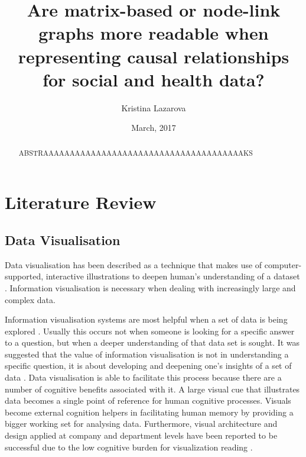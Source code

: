 \documentclass{l4proj}
\begin{document}
\title{Are matrix-based or node-link graphs more readable when representing causal relationships for social and health data?}
\author{Kristina Lazarova}
\date{March, 2017}
\maketitle

\begin{abstract}

ABSTRAAAAAAAAAAAAAAAAAAAAAAAAAAAAAAAAAAAAAAKS
\end{abstract}

\educationalconsent
%
%
\tableofcontents
\chapter{Literature Review}

\section{Data Visualisation}

Data visualisation has been described as a technique that makes use of computer-supported, interactive illustrations to deepen human's understanding of a dataset \cite{card1999readings}. Information visualisation is necessary when dealing with increasingly large and complex data.

Information visualisation systems are most helpful when a set of data is being explored \cite{fekete2008value}. Usually this occurs not when someone is looking for a specific answer to a question, but when a deeper understanding of that data set is sought. It was suggested that the value of information visualisation is not in understanding a specific question, it is about developing and deepening one's insights of a set of data \cite{fekete2008value}. Data visualisation is able to facilitate this process because there are a number of cognitive benefits associated with it. A large visual cue that illustrates data becomes a single point of reference for human cognitive processes. Visuals become external cognition helpers in facilitating human memory by providing a bigger working set for analysing data. Furthermore, visual architecture and design applied at company and department levels have been reported to be successful due to the low cognitive burden for visualization reading \cite{king2016cognitive}.
\end{document}
